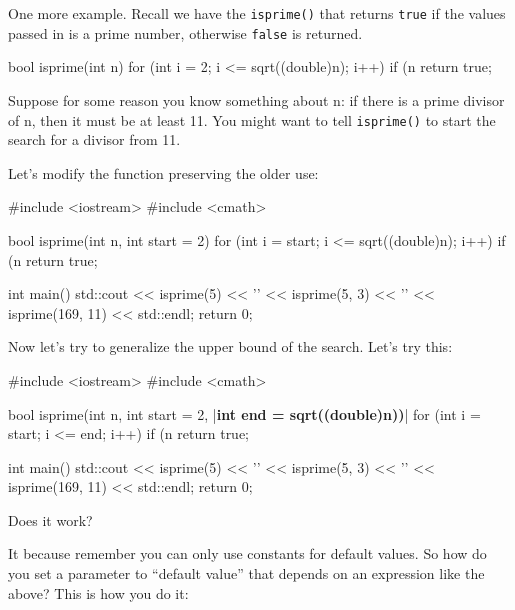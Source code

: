 \newpage{}

One more example. Recall we have the \texttt{isprime()} that returns \texttt{true} if the values passed in is a prime number, otherwise \texttt{false} is returned.

\begin{consolethree}[escapeinside=||]
bool isprime(int n)
{
    for (int i = 2; i <= sqrt((double)n); i++)
    {
        if (n %
    }
    return true;
}
\end{consolethree}

Suppose for some reason you know something about n: if there is a prime divisor of n, then it must be at least 11. You might want to tell \texttt{isprime()} to start the search for a divisor from 11.

Let's modify the function preserving the older use:

\begin{consolethree}[escapeinside=||]
#include <iostream>
#include <cmath>

bool isprime(int n, int start = 2)
{
    for (int i = start; i <= sqrt((double)n); i++)
    {
        if (n %
    }
    return true;
}

int main()
{
    std::cout << isprime(5) << '\n'
              << isprime(5, 3) << '\n'
              << isprime(169, 11) << std::endl;
    return 0;
}
\end{consolethree}

Now let's try to generalize the upper bound of the search. Let's try this:

\begin{consolethree}[escapeinside=||]
#include <iostream>
#include <cmath>

bool isprime(int n,
             int start = 2,
             |\textbf{int end = sqrt((double)n))}|
{
    for (int i = start; i <= end; i++)
    {
        if (n %
    }
    return true;
}

int main()
{
    std::cout << isprime(5) << '\n'
              << isprime(5, 3) << '\n'
              << isprime(169, 11) << std::endl;
    return 0;
}
\end{consolethree}

Does it work?

It  because remember you can only use constants for default values. So how do you set a parameter to ``default value'' that depends on an expression like the above? This is how you do it:

